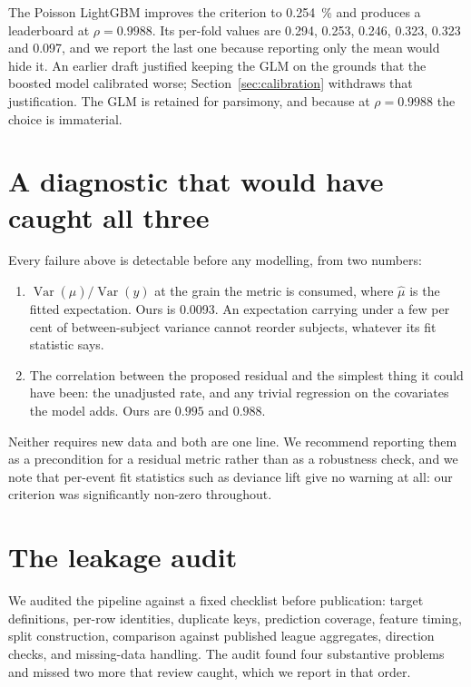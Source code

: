 \documentclass[11pt,letterpaper]{article}
\begin{document}
The Poisson LightGBM improves the criterion to \SI{0.254}{\percent} and produces
a leaderboard at $\rho = 0.9988$. Its per-fold values are 0.294, 0.253, 0.246,
0.323, 0.323 and 0.097, and we report the last one because reporting only the
mean would hide it. An earlier draft justified keeping the GLM on the grounds
that the boosted model calibrated worse; Section~\ref{sec:calibration} withdraws
that justification. The GLM is retained for parsimony, and because at
$\rho = 0.9988$ the choice is immaterial.

\section{A diagnostic that would have caught all three}
\label{sec:diagnostic}

Every failure above is detectable before any modelling, from two numbers:

\begin{enumerate}
\item $\operatorname{Var}(\hat{\mu}) / \operatorname{Var}(y)$ at the grain the
metric is consumed, where $\hat\mu$ is the fitted expectation. Ours is
\num{0.0093}. An expectation carrying under a few per cent of between-subject
variance cannot reorder subjects, whatever its fit statistic says.
\item The correlation between the proposed residual and the simplest thing it
could have been: the unadjusted rate, and any trivial regression on the
covariates the model adds. Ours are $0.995$ and $0.988$.
\end{enumerate}

Neither requires new data and both are one line. We recommend reporting them as a
precondition for a residual metric rather than as a robustness check, and we note
that per-event fit statistics such as deviance lift give no warning at all: our
criterion was significantly non-zero throughout.

\section{The leakage audit}
\label{sec:audit}

We audited the pipeline against a fixed checklist before publication: target
definitions, per-row identities, duplicate keys, prediction coverage, feature
timing, split construction, comparison against published league aggregates,
direction checks, and missing-data handling. The audit found four substantive
problems and missed two more that review caught, which we report in that order.
\end{document}
